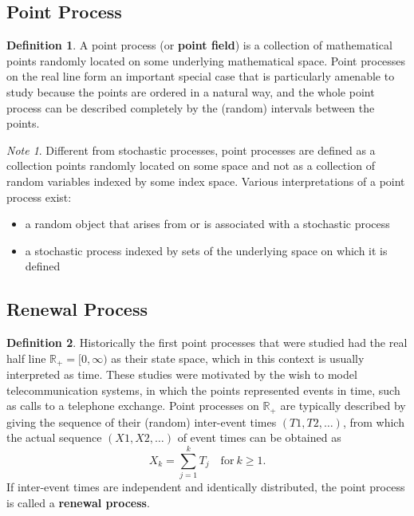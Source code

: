 \documentclass[12pt]{article}
\theoremstyle{plain}
\theoremstyle{definition}
\newtheorem{definition}{Definition}
\theoremstyle{remark}
\newtheorem*{note}{Note}
\begin{document}
\subsection{Point Process}

\begin{definition}
  A point process (or \textbf{point field}) is a collection of mathematical
  points randomly located on some underlying mathematical space.
  Point processes on the real line form an important special case that is
  particularly amenable to study because the points are ordered in a natural
  way, and the whole point process can be described completely by the (random)
  intervals between the points.
\end{definition}

\begin{note}
  Different from stochastic processes, point processes are defined as a
  collection points randomly located on some space and not as a collection of
  random variables indexed by some index space.
  Various interpretations of a point process exist:
  \begin{itemize}
  \item a random object that arises from or is associated with a stochastic
    process
  \item a stochastic process indexed by sets of the underlying space on which it
    is defined
  \end{itemize}
\end{note}

\pagebreak

\subsection{Renewal Process}

\begin{definition}
  Historically the first point processes that were studied had the real half
  line $\mathbb{R}_+ = [0,\infty)$ as their state space, which in this context
  is usually interpreted as time.
  These studies were motivated by the wish to model telecommunication systems,
  in which the points represented events in time, such as calls to a telephone
  exchange.
  Point processes on $\mathbb{R}_+$ are typically described by giving the
  sequence of their (random) inter-event times $(T1,T2,\dots)$, from which the
  actual sequence $(X1,X2,\dots)$ of event times can be obtained as
  \begin{equation*}
    X_k = \sum_{j=1}^{k} T_j\quad \text{for}\ k \geq 1.
  \end{equation*}
  If inter-event times are independent and identically distributed, the point
  process is called a \textbf{renewal process}.
\end{definition}
\end{document}
